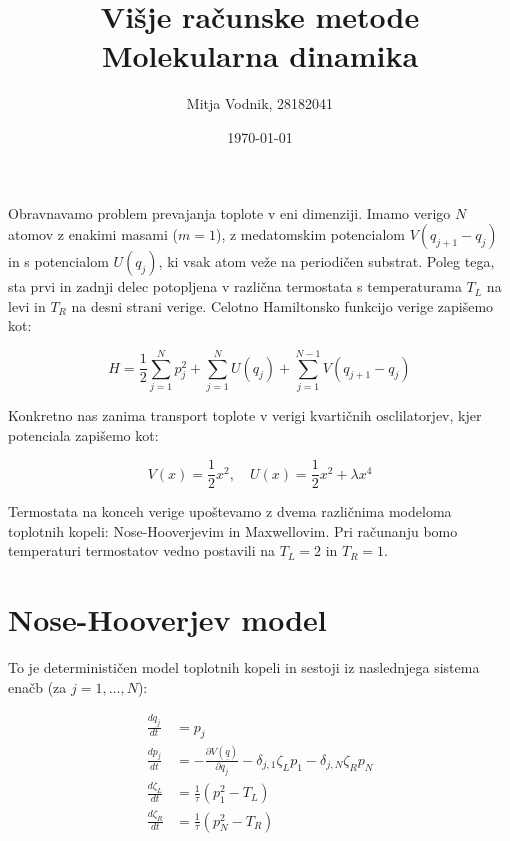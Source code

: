 \documentclass[a4paper]{article}
\newcommand{\der}[2]{\frac{d#1}{d#2}}
\newcommand{\pder}[2]{\frac{\partial#1}{\partial#2}}
\newcommand{\half}{\frac{1}{2}}
\newcommand{\q}{\underline{q}}
\newcommand{\tinv}{\frac{1}{\tau}}
\begin{document}
    \title{\sc\large Višje računske metode\\
		\bigskip
		\bf\Large Molekularna dinamika}
	\author{Mitja Vodnik, 28182041}
	\date{\today}
	\maketitle

    Obravnavamo problem prevajanja toplote v eni dimenziji.
    Imamo verigo $N$ atomov z enakimi masami ($m = 1$), z medatomskim potencialom $V(q_{j+1} - q_j)$ in s potencialom
    $U(q_j)$, ki vsak atom veže na periodičen substrat.
    Poleg tega, sta prvi in zadnji delec potopljena v različna termostata s temperaturama $T_L$ na levi in $T_R$ na
    desni strani verige.
    Celotno Hamiltonsko funkcijo verige zapišemo kot:

    \begin{equation}\label{eq1}
        H = \half \sum_{j=1}^{N} p_j^2 + \sum_{j=1}^N U(q_j) + \sum_{j=1}^{N-1} V(q_{j+1} - q_j)
    \end{equation}

    Konkretno nas zanima transport toplote v verigi kvartičnih osclilatorjev, kjer potenciala zapišemo kot:

    \begin{equation}\label{eq2}
        V(x) = \half x^2, \quad U(x) = \half x^2 + \lambda x^4
    \end{equation}

    Termostata na konceh verige upoštevamo z dvema različnima modeloma toplotnih kopeli: Nose-Hooverjevim in Maxwellovim.
    Pri računanju bomo temperaturi termostatov vedno postavili na $T_L = 2$ in $T_R = 1$.

    \section{Nose-Hooverjev model}

    To je determinističen model toplotnih kopeli in sestoji iz naslednjega sistema enačb (za $j = 1, \ldots, N$):

    \begin{equation}\label{eq3}
        \begin{split}
            \der{q_j}{t} &= p_j\\
            \der{p_j}{t} &= -\pder{V(\q)}{q_j} - \delta_{j,1}\zeta_L p_1 - \delta_{j,N}\zeta_R p_N\\
            \der{\zeta_L}{t} &= \tinv \left( p_1^2 - T_L \right)\\
            \der{\zeta_R}{t} &= \tinv \left( p_N^2 - T_R \right)
        \end{split}
    \end{equation}
\end{document}
